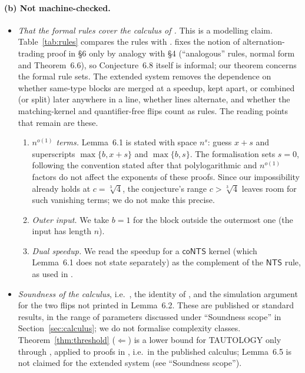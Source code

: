 \documentclass[11pt]{article}
\theoremstyle{definition}
\newcommand{\NTS}{\mathsf{NTS}}
\newcommand{\coNTS}{\mathsf{coNTS}}
\newcommand{\leanus}{\textunderscore\allowbreak}
\newcommand{\lean}[1]{\ifmmode\text{\ttfamily #1}\else{\ttfamily\let\_\leanus #1}\fi}
\newcommand{\cbrt}{\sqrt[3]{4}}
\begin{document}
\paragraph{(b) Not machine-checked.}
\begin{itemize}
\item \emph{That the formal rules cover the calculus of \cite{W13}.} This is a modelling claim. Table~\ref{tab:rules} compares the rules with \cite[\S2 and \S6]{W13}. \cite{W13} fixes the notion of alternation-trading proof in \S6 only by analogy with \S4 (``analogous'' rules, normal form and Theorem~6.6), so Conjecture~6.8 itself is informal; our theorem concerns the formal rule sets. The extended system \lean{WStepX} removes the dependence on whether same-type blocks are merged at a speedup, kept apart, or combined (or split) later anywhere in a line, whether lines alternate, and whether the matching-kernel and quantifier-free flips count as rules. The reading points that remain are these.
\begin{enumerate}
\item \emph{$n^{o(1)}$ terms.} Lemma~6.1 is stated with space $n^s$: guess $x+s$ and superscripts $\max\{b,x+s\}$ and $\max\{b,s\}$. The formalisation sets $s=0$, following the convention stated after \cite[Definition~4.1]{W13} that polylogarithmic and $n^{o(1)}$ factors do not affect the exponents of these proofs. Since our impossibility already holds at $c=\cbrt$, the conjecture's range $c>\cbrt$ leaves room for such vanishing terms; we do not make this precise.
\item \emph{Outer input.} We take $b=1$ for the block outside the outermost one (the input has length $n$).
\item \emph{Dual speedup.} We read the speedup for a $\coNTS$ kernel (which Lemma~6.1 does not state separately) as the complement of the $\NTS$ rule, as used in \cite[eq.~(18)]{W13}.
\end{enumerate}
\item \emph{Soundness of the calculus}, i.e.\ \cite[Theorem~3.1 and Lemmas~6.1--6.5]{W13}, the identity of \cite[\S2]{W13}, and the simulation argument for the two flips not printed in Lemma~6.2. These are published or standard results, in the range of parameters discussed under ``Soundness scope'' in Section~\ref{sec:calculus}; we do not formalise complexity classes. Theorem~\ref{thm:threshold} ($\Leftarrow$) is a lower bound for TAUTOLOGY only through \cite[Lemma~6.5]{W13}, applied to proofs in \lean{WStepE}, i.e.\ in the published calculus; Lemma~6.5 is not claimed for the extended system (see ``Soundness scope'').
\end{itemize}
\end{document}
